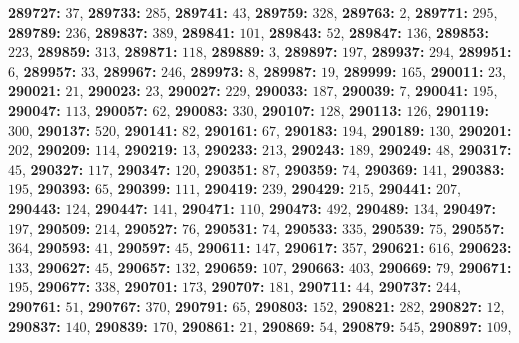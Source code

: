 \textsf{\bfseries 289727:} $37$, \textsf{\bfseries 289733:} $285$, \textsf{\bfseries 289741:} $43$, \textsf{\bfseries 289759:} $328$, \textsf{\bfseries 289763:} $2$, \textsf{\bfseries 289771:} $295$, \textsf{\bfseries 289789:} $236$, \textsf{\bfseries 289837:} $389$, \textsf{\bfseries 289841:} $101$, \textsf{\bfseries 289843:} $52$, \textsf{\bfseries 289847:} $136$, \textsf{\bfseries 289853:} $223$, \textsf{\bfseries 289859:} $313$, \textsf{\bfseries 289871:} $118$, \textsf{\bfseries 289889:} $3$, \textsf{\bfseries 289897:} $197$, \textsf{\bfseries 289937:} $294$, \textsf{\bfseries 289951:} $6$, \textsf{\bfseries 289957:} $33$, \textsf{\bfseries 289967:} $246$, \textsf{\bfseries 289973:} $8$, \textsf{\bfseries 289987:} $19$, \textsf{\bfseries 289999:} $165$, \textsf{\bfseries 290011:} $23$, \textsf{\bfseries 290021:} $21$, \textsf{\bfseries 290023:} $23$, \textsf{\bfseries 290027:} $229$, \textsf{\bfseries 290033:} $187$, \textsf{\bfseries 290039:} $7$, \textsf{\bfseries 290041:} $195$, \textsf{\bfseries 290047:} $113$, \textsf{\bfseries 290057:} $62$, \textsf{\bfseries 290083:} $330$, \textsf{\bfseries 290107:} $128$, \textsf{\bfseries 290113:} $126$, \textsf{\bfseries 290119:} $300$, \textsf{\bfseries 290137:} $520$, \textsf{\bfseries 290141:} $82$, \textsf{\bfseries 290161:} $67$, \textsf{\bfseries 290183:} $194$, \textsf{\bfseries 290189:} $130$, \textsf{\bfseries 290201:} $202$, \textsf{\bfseries 290209:} $114$, \textsf{\bfseries 290219:} $13$, \textsf{\bfseries 290233:} $213$, \textsf{\bfseries 290243:} $189$, \textsf{\bfseries 290249:} $48$, \textsf{\bfseries 290317:} $45$, \textsf{\bfseries 290327:} $117$, \textsf{\bfseries 290347:} $120$, \textsf{\bfseries 290351:} $87$, \textsf{\bfseries 290359:} $74$, \textsf{\bfseries 290369:} $141$, \textsf{\bfseries 290383:} $195$, \textsf{\bfseries 290393:} $65$, \textsf{\bfseries 290399:} $111$, \textsf{\bfseries 290419:} $239$, \textsf{\bfseries 290429:} $215$, \textsf{\bfseries 290441:} $207$, \textsf{\bfseries 290443:} $124$, \textsf{\bfseries 290447:} $141$, \textsf{\bfseries 290471:} $110$, \textsf{\bfseries 290473:} $492$, \textsf{\bfseries 290489:} $134$, \textsf{\bfseries 290497:} $197$, \textsf{\bfseries 290509:} $214$, \textsf{\bfseries 290527:} $76$, \textsf{\bfseries 290531:} $74$, \textsf{\bfseries 290533:} $335$, \textsf{\bfseries 290539:} $75$, \textsf{\bfseries 290557:} $364$, \textsf{\bfseries 290593:} $41$, \textsf{\bfseries 290597:} $45$, \textsf{\bfseries 290611:} $147$, \textsf{\bfseries 290617:} $357$, \textsf{\bfseries 290621:} $616$, \textsf{\bfseries 290623:} $133$, \textsf{\bfseries 290627:} $45$, \textsf{\bfseries 290657:} $132$, \textsf{\bfseries 290659:} $107$, \textsf{\bfseries 290663:} $403$, \textsf{\bfseries 290669:} $79$, \textsf{\bfseries 290671:} $195$, \textsf{\bfseries 290677:} $338$, \textsf{\bfseries 290701:} $173$, \textsf{\bfseries 290707:} $181$, \textsf{\bfseries 290711:} $44$, \textsf{\bfseries 290737:} $244$, \textsf{\bfseries 290761:} $51$, \textsf{\bfseries 290767:} $370$, \textsf{\bfseries 290791:} $65$, \textsf{\bfseries 290803:} $152$, \textsf{\bfseries 290821:} $282$, \textsf{\bfseries 290827:} $12$, \textsf{\bfseries 290837:} $140$, \textsf{\bfseries 290839:} $170$, \textsf{\bfseries 290861:} $21$, \textsf{\bfseries 290869:} $54$, \textsf{\bfseries 290879:} $545$, \textsf{\bfseries 290897:} $109$, 

